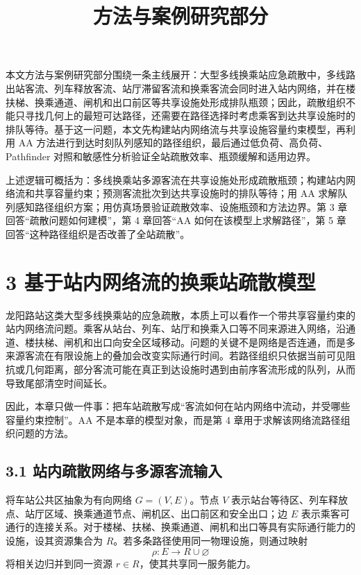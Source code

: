 \documentclass[UTF8,a4paper,12pt]{ctexart}
\title{方法与案例研究部分}
\author{}
\date{}
\begin{document}
\maketitle

本文方法与案例研究部分围绕一条主线展开：大型多线换乘站应急疏散中，多线路出站客流、列车释放客流、站厅滞留客流和换乘客流会同时进入站内网络，并在楼扶梯、换乘通道、闸机和出口前区等共享设施处形成排队瓶颈；因此，疏散组织不能只寻找几何上的最短可达路径，还需要在路径选择时考虑乘客到达共享设施时的排队等待。基于这一问题，本文先构建站内网络流与共享设施容量约束模型，再利用 AA 方法进行到达时刻队列感知的路径组织，最后通过低负荷、高负荷、Pathfinder 对照和敏感性分析验证全站疏散效率、瓶颈缓解和适用边界。

上述逻辑可概括为：多线换乘站多源客流在共享设施处形成疏散瓶颈；构建站内网络流和共享容量约束；预测客流批次到达共享设施时的排队等待；用 AA 求解队列感知路径组织方案；用仿真场景验证疏散效率、设施瓶颈和方法边界。第 3 章回答“疏散问题如何建模”，第 4 章回答“AA 如何在该模型上求解路径”，第 5 章回答“这种路径组织是否改善了全站疏散”。

\section{3 基于站内网络流的换乘站疏散模型}

龙阳路站这类大型多线换乘站的应急疏散，本质上可以看作一个带共享容量约束的站内网络流问题。乘客从站台、列车、站厅和换乘入口等不同来源进入网络，沿通道、楼扶梯、闸机和出口向安全区域移动。问题的关键不是网络是否连通，而是多来源客流在有限设施上的叠加会改变实际通行时间。若路径组织只依据当前可见阻抗或几何距离，部分客流可能在真正到达设施时遇到由前序客流形成的队列，从而导致尾部清空时间延长。

因此，本章只做一件事：把车站疏散写成“客流如何在站内网络中流动，并受哪些容量约束控制”。AA 不是本章的模型对象，而是第 4 章用于求解该网络流路径组织问题的方法。

\subsection{3.1 站内疏散网络与多源客流输入}

将车站公共区抽象为有向网络 \(G=(V,E)\)。节点 \(V\) 表示站台等待区、列车释放点、站厅区域、换乘通道节点、闸机区、出口前区和安全出口；边 \(E\) 表示乘客可通行的连接关系。对于楼梯、扶梯、换乘通道、闸机和出口等具有实际通行能力的设施，设其资源集合为 \(R\)。若多条路径使用同一物理设施，则通过映射
\[
\rho:E\rightarrow R\cup\varnothing
\]
将相关边归并到同一资源 \(r\in R\)，使其共享同一服务能力。
\end{document}
